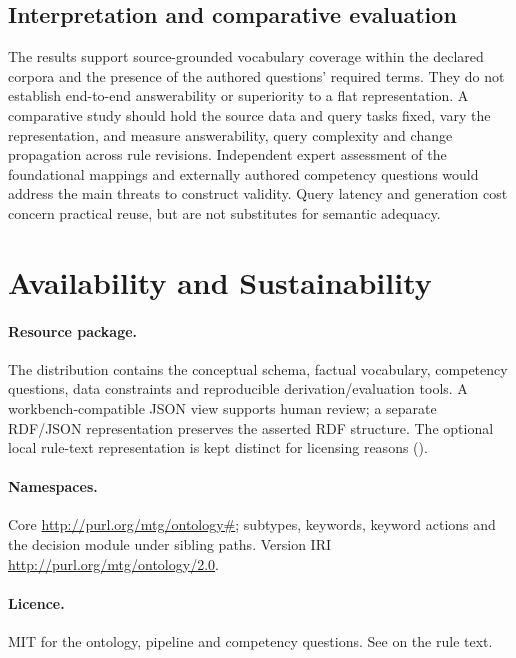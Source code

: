 \documentclass[11pt,a4paper]{article}
\begin{document}
\subsection{Interpretation and comparative evaluation}

The results support source-grounded vocabulary coverage within the declared corpora and the presence of the authored questions' required terms. They do not establish end-to-end answerability or superiority to a flat representation. A comparative study should hold the source data and query tasks fixed, vary the representation, and measure answerability, query complexity and change propagation across rule revisions. Independent expert assessment of the foundational mappings and externally authored competency questions would address the main threats to construct validity. Query latency and generation cost concern practical reuse, but are not substitutes for semantic adequacy.

\section{Availability and Sustainability}
\label{sec:availability}

\paragraph{Resource package.} The distribution contains the conceptual schema, factual vocabulary, competency questions, data constraints and reproducible derivation/evaluation tools. A workbench-compatible JSON view supports human review; a separate RDF/JSON representation preserves the asserted RDF structure. The optional local rule-text representation is kept distinct for licensing reasons ().

\paragraph{Namespaces.} Core \url{http://purl.org/mtg/ontology#}; subtypes, keywords, keyword actions and the decision module under sibling paths. Version IRI \url{http://purl.org/mtg/ontology/2.0}.

\paragraph{Licence.} MIT for the ontology, pipeline and competency questions. See  on the rule text.
\end{document}
